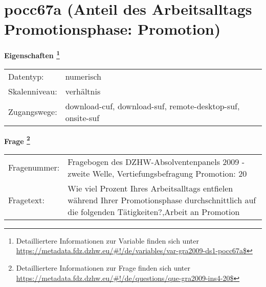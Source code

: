
    \setcounter{footnote}{0}

    \vspace*{-1.8cm}
	\section{pocc67a (Anteil des Arbeitsalltags Promotionsphase: Promotion)}
	\label{section:pocc67a}



    \vspace*{0.5cm}
    \noindent\textbf{Eigenschaften
	\footnote{Detailliertere Informationen zur Variable finden sich unter
		\url{https://metadata.fdz.dzhw.eu/\#!/de/variables/var-gra2009-ds1-pocc67a$}}}\\
	\begin{tabularx}{\hsize}{@{}lX}
	Datentyp: & numerisch \\
	Skalenniveau: & verhältnis \\
	Zugangswege: &
	  download-cuf, 
	  download-suf, 
	  remote-desktop-suf, 
	  onsite-suf
 \\
    \end{tabularx}



				\vspace*{0.5cm}
                \noindent\textbf{Frage
	                \footnote{Detailliertere Informationen zur Frage finden sich unter
		              \url{https://metadata.fdz.dzhw.eu/\#!/de/questions/que-gra2009-ins4-20$}}}\\
				\begin{tabularx}{\hsize}{@{}lX}
					Fragenummer: &
					  Fragebogen des DZHW-Absolventenpanels 2009 - zweite Welle, Vertiefungsbefragung Promotion:
					  20
 \\
					Fragetext: & Wie viel Prozent Ihres Arbeitsalltags entfielen während Ihrer Promotionsphase durchschnittlich auf die folgenden Tätigkeiten?,Arbeit an Promotion \\
				\end{tabularx}





